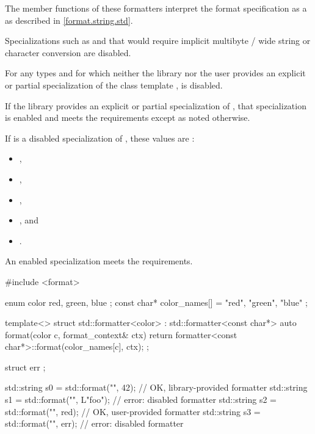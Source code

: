 The  member functions of these formatters
interpret the format specification
as a 
as described in \ref{format.string.std}.
\begin{note}
Specializations such as 
and 
that would require implicit
multibyte / wide string or character conversion are disabled.
\end{note}

\pnum
For any types  and  for which
neither the library nor the user provides
an explicit or partial specialization of
the class template ,
 is disabled.

\pnum
If the library provides an explicit or partial specialization of
, that specialization is enabled
and meets the  requirements
except as noted otherwise.

\pnum
If  is a disabled specialization of , these
values are :
\begin{itemize}
\item {},
\item {},
\item {},
\item {}, and
\item {}.
\end{itemize}

\pnum
An enabled specialization  meets the
 requirements.
\begin{example}
\begin{codeblock}
#include <format>

enum color { red, green, blue };
const char* color_names[] = { "red", "green", "blue" };

template<> struct std::formatter<color> : std::formatter<const char*> {
  auto format(color c, format_context& ctx) {
    return formatter<const char*>::format(color_names[c], ctx);
  }
};

struct err {};

std::string s0 = std::format("{}", 42);         // OK, library-provided formatter
std::string s1 = std::format("{}", L"foo");     // error: disabled formatter
std::string s2 = std::format("{}", red);        // OK, user-provided formatter
std::string s3 = std::format("{}", err{});      // error: disabled formatter
\end{codeblock}
\end{example}


